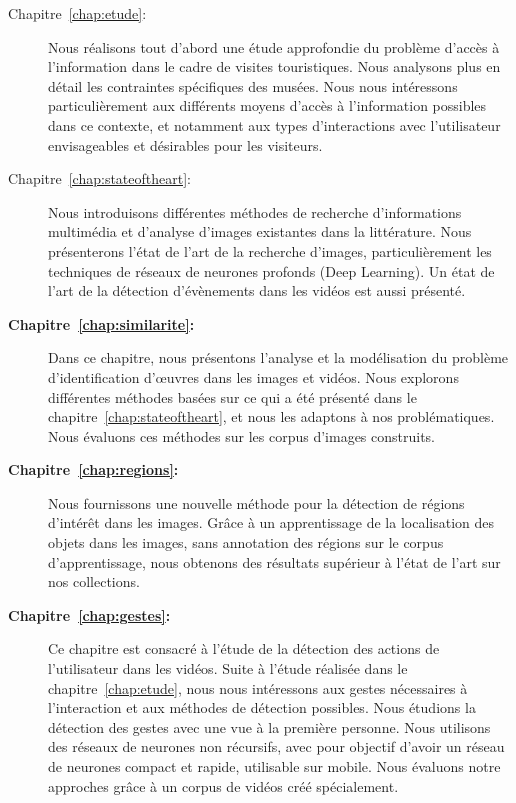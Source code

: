 \begin{description}
	\item[Chapitre~\ref{chap:etude}:~] Nous réalisons tout d'abord une étude approfondie du problème d'accès à l'information dans le cadre de visites touristiques.
Nous analysons plus en détail les contraintes spécifiques des musées.
Nous nous intéressons particulièrement aux différents moyens d'accès à l'information possibles dans ce contexte, et notamment aux types d'interactions avec l'utilisateur envisageables et désirables pour les visiteurs.

	\item[Chapitre~\ref{chap:stateoftheart}:~] Nous introduisons différentes méthodes de recherche d'informations multimédia et d'analyse d'images existantes dans la littérature.
Nous présenterons l'état de l'art de la recherche d'images, particulièrement les techniques de réseaux de neurones profonds (Deep Learning).
Un état de l'art de la détection d'évènements dans les vidéos est aussi présenté.

	\item[\textbf{Chapitre~\ref{chap:similarite}:~}] Dans ce chapitre, nous présentons l'analyse et la modélisation du problème d'identification d'œuvres dans les images et vidéos.
Nous explorons différentes méthodes basées sur ce qui a été présenté dans le chapitre~\ref{chap:stateoftheart}, et nous les adaptons à nos problématiques. Nous évaluons ces méthodes sur les corpus d'images construits. 

\item[\textbf{Chapitre~\ref{chap:regions}:~}] Nous fournissons une nouvelle méthode pour la détection de régions d'intérêt dans les images. Grâce à un apprentissage de la localisation des objets dans les images, sans annotation des régions sur le corpus d'apprentissage, nous obtenons des résultats supérieur à l'état de l'art sur nos collections. 

	\item[\textbf{Chapitre~\ref{chap:gestes}:~}] Ce chapitre est consacré à l'étude de la détection des actions de l'utilisateur dans les vidéos.
Suite à l'étude réalisée dans le chapitre~\ref{chap:etude}, nous nous intéressons aux gestes nécessaires à l'interaction et aux méthodes de détection possibles. Nous étudions la détection des gestes avec une vue à la première personne. Nous utilisons des réseaux de neurones non récursifs, avec pour objectif d'avoir un réseau de neurones compact et rapide, utilisable sur mobile. Nous évaluons notre approches grâce à un corpus de vidéos créé spécialement.


\end{description}
